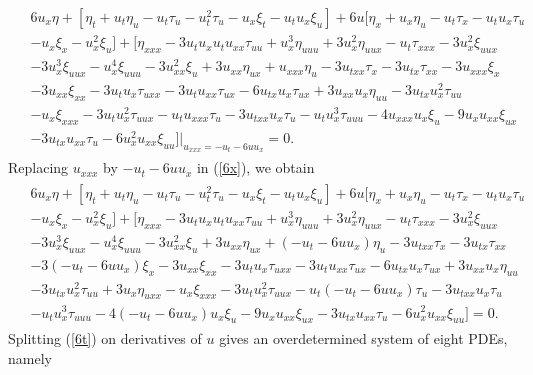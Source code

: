 \begin{align}\begin{aligned} \label{6x}
& 
6u_x\eta+ [\eta_t +u_t \eta_u -u_t\tau_u-u^2_t \tau_u-u_x \xi_t-u_tu_x \xi_u ] + 6u[\eta_x +  u_x \eta_u- u_t\tau_x- u_t u_x\tau_u\\
&
- u_x\xi_x - u^2_x\xi_u]+[\eta_{xxx}
-3u_{t}u_xu_{t}u_{xx}\tau_{uu}+u_{x}^3\eta_{uuu}+3u_{x}^2\eta_{uux}-u_t\tau_{xxx}-3u^2_x\xi_{uux} \\
&
-3u_{x}^3 \xi_{uux}-u_{x}^4\xi_{uuu}-3u_{xx}^2 \xi_{u}+3u_{xx} \eta_{ux} +u_{xxx}\eta_u-3u_{txx}\tau_{x} -3u_{tx}\tau_{xx}-3u_{xxx} \xi_{x}\\
&
-3u_{xx}\xi_{xx}-3u_t u_{x}\tau_{uxx}-3u_t u_{xx} \tau_{ux}-6u_{tx} u_x \tau_{ux}+3u_{xx} u_x\eta_{uu}-3u_{tx}u_{x}^2 \tau_{uu} \\
&
-u_{x}\xi_{xxx}-3u_{t} u_{x}^2\tau_{uux}-u_{t} u_{xxx}\tau_u -3u_{txx} u_x\tau_u-u_{t} u_{x}^3\tau_{uuu}-4u_{xxx} u_x\xi_u-9 u_{x} u_{xx}\xi_{ux}\\
&
-3u_{tx} u_{xx}\tau_u-6u_{x}^2 u_{xx}\xi_{uu}] \Big|_{ u_{xxx}=-u_{t}-6 uu_x}  =0.\end{aligned}
\end{align}
Replacing  $u_{xxx}$ by $-u_{t}-6 uu_x $  in (\ref{6x}), we obtain
\begin{align}\begin{aligned}
&6u_x\eta+ [\eta_t +u_t \eta_u -u_t\tau_u-u^2_t \tau_u-u_x \xi_t-u_tu_x \xi_u ] + 6u[\eta_x +  u_x \eta_u- u_t\tau_x- u_t u_x\tau_u\\
&
- u_x\xi_x - u^2_x\xi_u]+[\eta_{xxx}
-3u_{t}u_xu_{t}u_{xx}\tau_{uu}+u_{x}^3\eta_{uuu}+3u_{x}^2\eta_{uux}-u_t\tau_{xxx}-3u^2_x\xi_{uux} \\
&
-3u_{x}^3 \xi_{uux}-u_{x}^4\xi_{uuu}-3u_{xx}^2 \xi_{u}+3u_{xx} \eta_{ux} +(-u_{t}-6 uu_x)\eta_u-3u_{txx}\tau_{x} -3u_{tx}\tau_{xx}\\
&
-3(-u_{t}-6 uu_x) \xi_{x}-3u_{xx}\xi_{xx}-3u_t u_{x}\tau_{uxx} -3u_t u_{xx} \tau_{ux}-6u_{tx} u_x \tau_{ux}+3u_{xx} u_x\eta_{uu}\\ 
&
-3u_{tx}u_{x}^2 \tau_{uu}+3u_{x}\eta_{uxx}-u_{x}\xi_{xxx}-3u_{t} u_{x}^2\tau_{uux}-u_{t} (-u_{t}-6 uu_x)\tau_u -3u_{txx} u_x\tau_u \\
&-u_{t} u_{x}^3\tau_{uuu}-4(-u_{t}-6 uu_x) u_x\xi_u-9 u_{x} u_{xx}\xi_{ux}-3u_{tx} u_{xx}\tau_u
-6u_{x}^2 u_{xx}\xi_{uu}]=0. \label{6t}\end{aligned}
\end{align}
 Splitting  (\ref{6t}) on  derivatives of $u$ gives an overdetermined system of eight PDEs, namely
